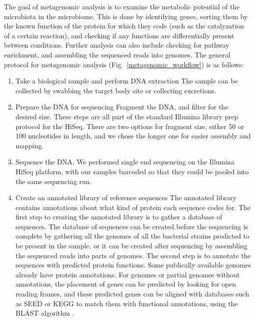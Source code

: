 The goal of metagenomic analysis is to examine the metabolic potential of the microbiota in the microbiome. This is done by identifying genes, sorting them by the known function of the protein for which they code (such as the catalyzation of a certain reaction), and checking if any functions are differentially present between conditions. Further analysis can also include checking for pathway enrichment, and assembling the sequenced reads into genomes. The general protocol for metagenomic analysis (Fig.~\ref{metagenomic_workflow}) is as follows:

\begin{enumerate}
\item Take a biological sample and perform DNA extraction
The sample can be collected by swabbing the target body site or collecting excretions.

\item Prepare the DNA for sequencing
Fragment the DNA, and filter for the desired size. These steps are all part of the standard Illumina library prep protocol for the HiSeq. There are two options for fragment size, either 50 or 100 nucleotides in length, and we chose the longer one for easier assembly and mapping.

\item Sequence the DNA.
We performed single end sequencing on the Illumina HiSeq platform, with our samples barcoded so that they could be pooled into the same sequencing run.

\item Create an annotated library of reference sequences
The annotated library contains annotations about what kind of protein each sequence codes for. The first step to creating the annotated library is to gather a database of sequences. The database of sequences can be created before the sequencing is complete by gathering all the genomes of all the bacterial strains predicted to be present in the sample, or it can be created after sequencing by assembling the sequenced reads into parts of genomes. The second step is to annotate the sequences with predicted protein functions. Some publically available genomes already have protein annotations. For genomes or partial genomes without annotations, the placement of genes can be predicted by looking for open reading frames, and these predicted genes can be aligned with databases such as SEED \cite{overbeek2005subsystems} or KEGG \cite{kanehisa2000kegg} to match them with functional annotations, using the BLAST algorithm \cite{altschul1990basic}.


\end{enumerate}
